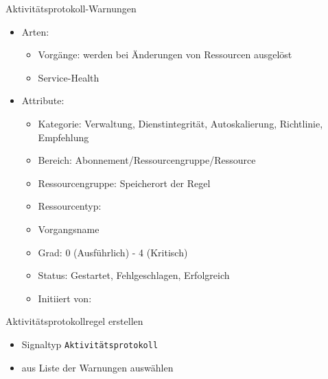\begin{flashcard}[Definition]{Aktivitätsprotokoll-Warnungen}
    \begin{itemize}
        \item Arten:
            \begin{itemize}
                \item Vorgänge: werden bei Änderungen von Ressourcen ausgelöst
                \item Service-Health
            \end{itemize}
        \item Attribute:
            \begin{itemize}
                \item Kategorie: Verwaltung, Dienstintegrität, Autoskalierung, Richtlinie, Empfehlung
                \item Bereich: Abonnement/Ressourcengruppe/Ressource
                \item Ressourcengruppe: Speicherort der Regel
                \item Ressourcentyp:
                \item Vorgangsname
                \item Grad: 0 (Ausführlich) - 4 (Kritisch)
                \item Status: Gestartet, Fehlgeschlagen, Erfolgreich
                \item Initiiert von:
            \end{itemize}
    \end{itemize}
\end{flashcard}

\begin{flashcard}[Definition]{Aktivitätsprotokollregel erstellen}
    \begin{itemize}
        \item Signaltyp \texttt{Aktivitätsprotokoll}
        \item aus Liste der Warnungen auswählen
    \end{itemize}
\end{flashcard}


